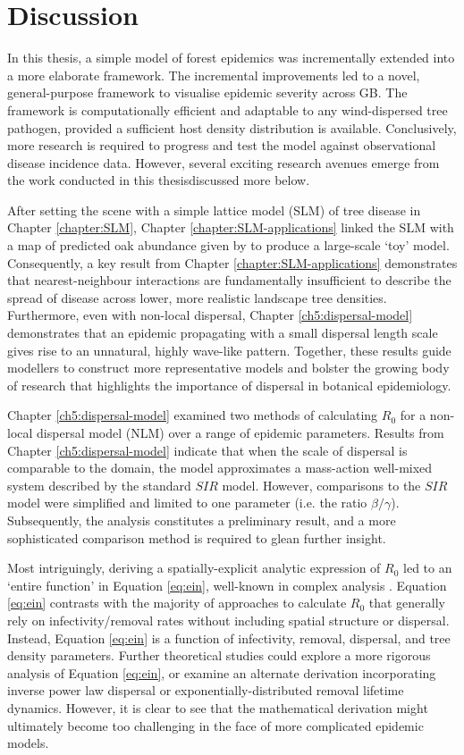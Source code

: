 
\chapter{Discussion}

In this thesis, a simple model of forest epidemics was incrementally extended into a more elaborate framework.
The incremental improvements led to a novel, general-purpose framework to visualise epidemic severity across GB.
The framework is computationally efficient and adaptable to any wind-dispersed tree pathogen, provided a sufficient host density distribution is available. Conclusively, more research is required to progress and test the model against observational disease incidence data.
However, several exciting research avenues emerge from the work conducted in this thesis\textemdash discussed more below.

After setting the scene with a simple lattice model (SLM) of tree disease in Chapter \ref{chapter:SLM}, 
Chapter \ref{chapter:SLM-applications} linked the SLM with a map of predicted oak abundance given by \cite{hill.data} to produce a large-scale `toy' model. Consequently, a key result from Chapter \ref{chapter:SLM-applications} demonstrates that nearest-neighbour interactions are
fundamentally insufficient to describe the spread of disease across lower, more realistic landscape tree densities. 
Furthermore, even with non-local dispersal, Chapter \ref{ch5:dispersal-model} demonstrates that an epidemic propagating with a small dispersal length scale gives rise to an unnatural, highly wave-like pattern. Together, these results guide modellers to construct more representative models and bolster the growing body of research that highlights the importance of dispersal in botanical epidemiology.

Chapter \ref{ch5:dispersal-model} examined two methods of calculating $R_0$ for a non-local dispersal model (NLM) over a range of epidemic parameters. Results from Chapter \ref{ch5:dispersal-model} indicate that when the scale of dispersal is comparable to the domain, the model approximates a mass-action well-mixed system described by the standard $SIR$ model. However, comparisons to the $SIR$ model were simplified and limited to one parameter (i.e. the ratio $\beta/\gamma$). Subsequently, the analysis constitutes a preliminary result, and a more sophisticated comparison method is required to glean further insight.

Most intriguingly, deriving a spatially-explicit analytic expression of $R_0$ led to an `entire function' in Equation \ref{eq:ein}, well-known in complex analysis \cite{abramowitz1948handbook}. 
Equation \ref{eq:ein} contrasts with the majority of approaches to calculate $R_0$ that generally rely on infectivity/removal rates without including spatial structure or dispersal. Instead, Equation \ref{eq:ein} is a function of infectivity, removal, dispersal, and tree density parameters. Further theoretical studies could explore a more rigorous analysis of Equation \ref{eq:ein}, or examine an alternate derivation incorporating inverse power law dispersal or exponentially-distributed removal lifetime dynamics.
However, it is clear to see that the mathematical derivation might ultimately become too challenging in the face of more complicated epidemic models. 

